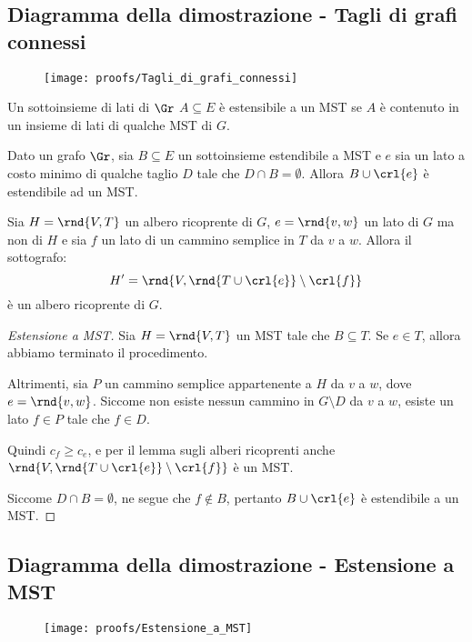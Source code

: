 \documentclass[\main/main.tex]{subfiles}
\begin{document}
\subsection{Diagramma della dimostrazione - Tagli di grafi connessi}
\begin{figure}
  \texttt{[image: proofs/Tagli\_di\_grafi\_connessi]}
\end{figure}
\clearpage
\begin{definition}
  Un sottoinsieme di lati di \(\Gr \) \(A \subseteq E\) è estensibile a un MST se \(A\) è contenuto in un insieme di lati di qualche MST di \(G\).
\end{definition}
\begin{theorem}
  Dato un grafo \(\Gr \), sia \(B \subseteq E\) un sottoinsieme estendibile a MST e \(e\) sia un lato a costo minimo di qualche taglio \(D\) tale che \(D \cap B = \emptyset \). Allora \(B \cup \crl{e}\) è estendibile ad un MST.
\end{theorem}
\begin{lemma}
  Sia \(H = \rnd{V, T}\) un albero ricoprente di \(G\), \(e = \rnd{v,w}\) un lato di \(G\) ma non di \(H\) e sia \(f\) un lato di un cammino semplice in \(T\) da \(v\) a \(w\). Allora il sottografo:
  \[
    H' = \rnd{V, \rnd{T \cup \crl{e}}\setminus \crl{f}}
  \]
  è un albero ricoprente di \(G\).
\end{lemma}
\begin{proof}[Estensione a MST]
  Sia \(H = \rnd{V, T}\) un MST tale che \(B \subseteq T\). Se \(e \in T\), allora abbiamo terminato il procedimento.

  Altrimenti, sia \(P\) un cammino semplice appartenente a \(H\) da \(v\) a \(w\), dove \(e = \rnd{v, w}\). Siccome non esiste nessun cammino in \(G\setminus D\) da \(v\) a \(w\), esiste un lato \(f \in P\) tale che \(f \in D\).

  Quindi \(c_f \geq c_e\), e per il lemma sugli alberi ricoprenti anche \(\rnd{V, \rnd{T \cup \crl{e}} \setminus \crl{f}}\) è un MST.

  Siccome \(D \cap B = \emptyset \), ne segue che \(f \not\in B\), pertanto \(B \cup \crl{e}\) è estendibile a un MST.
\end{proof}
\clearpage
\subsection{Diagramma della dimostrazione - Estensione a MST}
\begin{figure}
  \texttt{[image: proofs/Estensione\_a\_MST]}
\end{figure}
\clearpage
\end{document}

